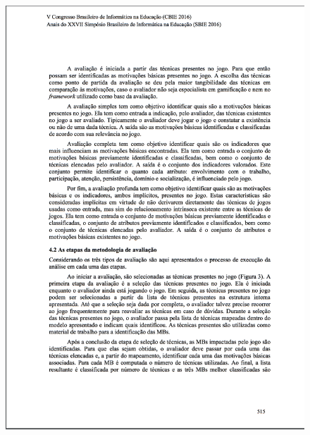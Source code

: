 \begin{apendicesenv}
\begin{figure}[h]
	\centering
		\includegraphics[keepaspectratio=true,scale=0.6]{figuras/a6.png}
\end{figure}


\end{apendicesenv}
